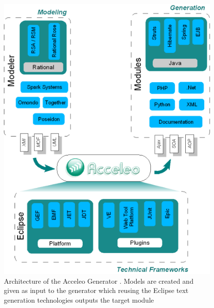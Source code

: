 \begin{figure}
  \begin{center}
    \includegraphics[scale=0.7]{pictures/acceleo-archi-en.png}
    \caption{Architecture of the Acceleo Generator \cite{AcceleoArchitectureWeb}. Models are created and given as input to the generator which reusing the Eclipse text generation technologies outputs the target module}
    \label{fig:AcceleoArchitecture}
  \end{center}
\end{figure}






